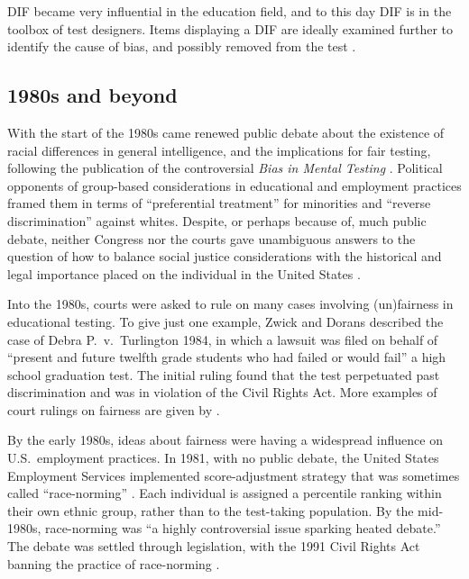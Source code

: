 \documentclass[sigconf,letterpaper,9pt]{acmart}
\begin{document}
DIF became very influential in the education field, and
to this day DIF is in the toolbox of test designers. 
Items displaying a DIF are ideally examined further to identify
the cause of bias, and possibly removed from the test \cite{penfield2016fairness}.


\subsection{1980s and beyond}

With the start of the 1980s came renewed public debate 
about the existence of racial differences in general intelligence,
and the implications for fair testing,
following the publication of the controversial {\em Bias in Mental Testing}
\cite{jensen1980bias}. Political opponents of group-based 
considerations in educational and employment practices 
framed them in terms of ``preferential treatment''
for minorities and ``reverse discrimination'' against whites.
Despite, or perhaps because of, much public debate,
neither Congress nor the courts gave unambiguous answers to the question
of how to balance social justice considerations with the historical
and legal importance placed on the individual in the United States \cite{national1989fairness}.

Into the 1980s, courts were asked to rule on many cases involving (un)fairness in 
educational testing. 
To give just one example, 
Zwick and Dorans \cite{zwick2016philosophical} described the case of Debra P.\ v.\ Turlington  1984, in which a lawsuit was filed on behalf of ``present and future twelfth grade students who had failed or would fail'' a high school graduation test. The initial ruling found that the test perpetuated past discrimination and was in violation of the Civil Rights Act.  More examples of court rulings on fairness are given by  \cite{phillips2016legal, zwick2016philosophical}.

By the early 1980s, ideas about fairness were having a widespread
influence on U.S.\ employment practices. In 1981, with no
public debate, the United States
Employment Services implemented score-adjustment strategy that was
sometimes called ``race-norming'' \cite{rice1994race}. Each individual is assigned
a percentile ranking within their own ethnic group, rather than
to the test-taking population. By the mid-1980s, race-norming was ``a highly
controversial issue sparking heated debate.'' The debate was settled through
legislation, with the 1991 Civil Rights Act banning the practice of race-norming
\cite{west2011fairness}.
\end{document}
